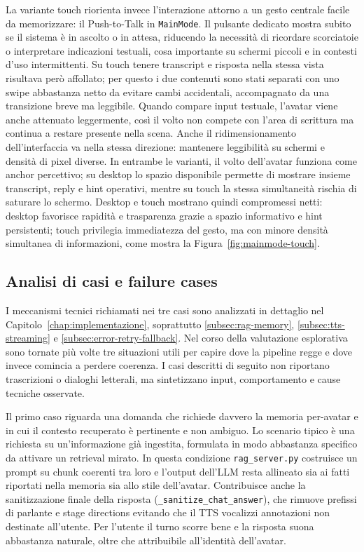 La variante touch riorienta invece l'interazione attorno a un gesto centrale facile da memorizzare: il Push-to-Talk in \texttt{MainMode}. Il pulsante dedicato mostra subito se il sistema è in ascolto o in attesa, riducendo la necessità di ricordare scorciatoie o interpretare indicazioni testuali, cosa importante su schermi piccoli e in contesti d'uso intermittenti. Su touch tenere transcript e risposta nella stessa vista risultava però affollato; per questo i due contenuti sono stati separati con uno swipe abbastanza netto da evitare cambi accidentali, accompagnato da una transizione breve ma leggibile. Quando compare input testuale, l'avatar viene anche attenuato leggermente, così il volto non compete con l'area di scrittura ma continua a restare presente nella scena. Anche il ridimensionamento dell'interfaccia va nella stessa direzione: mantenere leggibilità su schermi e densità di pixel diverse. In entrambe le varianti, il volto dell'avatar funziona come anchor percettivo; su desktop lo spazio disponibile permette di mostrare insieme transcript, reply e hint operativi, mentre su touch la stessa simultaneità rischia di saturare lo schermo. Desktop e touch mostrano quindi compromessi netti: desktop favorisce rapidità e trasparenza grazie a spazio informativo e hint persistenti; touch privilegia immediatezza del gesto, ma con minore densità simultanea di informazioni, come mostra la Figura~\ref{fig:mainmode-touch}.


\subsection{Analisi di casi e failure cases}
I meccanismi tecnici richiamati nei tre casi sono analizzati in dettaglio nel Capitolo~\ref{chap:implementazione}, soprattutto \autoref{subsec:rag-memory}, \autoref{subsec:tts-streaming} e \autoref{subsec:error-retry-fallback}. Nel corso della valutazione esplorativa sono tornate più volte tre situazioni utili per capire dove la pipeline regge e dove invece comincia a perdere coerenza. I casi descritti di seguito non riportano trascrizioni o dialoghi letterali, ma sintetizzano input, comportamento e cause tecniche osservate.

Il primo caso riguarda una domanda che richiede davvero la memoria per-avatar e in cui il contesto recuperato è pertinente e non ambiguo. Lo scenario tipico è una richiesta su un'informazione già ingestita, formulata in modo abbastanza specifico da attivare un retrieval mirato. In questa condizione \texttt{rag\_server.py} costruisce un prompt su chunk coerenti tra loro e l'output dell'LLM resta allineato sia ai fatti riportati nella memoria sia allo stile dell'avatar. Contribuisce anche la sanitizzazione finale della risposta (\texttt{\_sanitize\_chat\_answer}), che rimuove prefissi di parlante e stage directions evitando che il TTS vocalizzi annotazioni non destinate all'utente. Per l'utente il turno scorre bene e la risposta suona abbastanza naturale, oltre che attribuibile all'identità dell'avatar.

